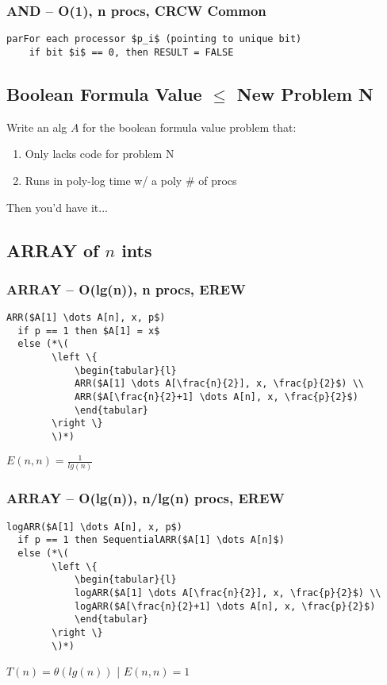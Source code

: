 \documentclass[12pt]{article}
\providecommand{\tightlist}{
    \setlength{\itemsep}{0pt}\setlength{\parskip}{0pt}
}
\providecommand{\reducible}[2]{
  \textbf{#1} $\leq$ \textbf{#2}
}
\begin{document}
\subsubsection{AND -- O(1), n procs, CRCW Common}
\begin{lstlisting}
parFor each processor $p_i$ (pointing to unique bit)
    if bit $i$ == 0, then RESULT = FALSE
\end{lstlisting}


\subsection{\reducible{Boolean Formula Value}{New Problem N}}
Write an alg $A$ for the boolean formula value problem that:\\
\begin{enumerate}\tightlist
  \item Only lacks code for problem N
  \item Runs in poly-log time w/ a poly \# of procs
\end{enumerate}
Then you'd have it...


\subsection{ARRAY of $n$ ints}
\subsubsection{ARRAY -- O(lg(n)), n procs, EREW}
\begin{lstlisting}
ARR($A[1] \dots A[n], x, p$)
  if p == 1 then $A[1] = x$
  else (*\(
        \left \{
            \begin{tabular}{l}
            ARR($A[1] \dots A[\frac{n}{2}], x, \frac{p}{2}$) \\
            ARR($A[\frac{n}{2}+1] \dots A[n], x, \frac{p}{2}$)
            \end{tabular}
        \right \}
        \)*)
\end{lstlisting}
$E(n,n) = \frac{1}{lg(n)}$
\subsubsection{ARRAY -- O(lg(n)), n/lg(n) procs, EREW}
\begin{lstlisting}
logARR($A[1] \dots A[n], x, p$)
  if p == 1 then SequentialARR($A[1] \dots A[n]$)
  else (*\(
        \left \{
            \begin{tabular}{l}
            logARR($A[1] \dots A[\frac{n}{2}], x, \frac{p}{2}$) \\
            logARR($A[\frac{n}{2}+1] \dots A[n], x, \frac{p}{2}$)
            \end{tabular}
        \right \}
        \)*)
\end{lstlisting}
$T(n) = \theta(lg(n))$ | $E(n,n) = 1$
\end{document}

